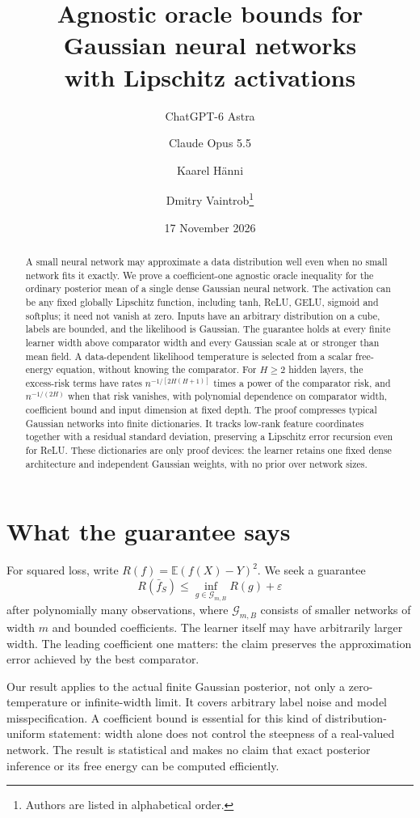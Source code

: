 \documentclass[11pt]{article}
\title{Agnostic oracle bounds for Gaussian neural networks\\with Lipschitz activations}
\author{ChatGPT-6 Astra \and Claude Opus 5.5 \and Kaarel H\"anni \and
Dmitry Vaintrob\thanks{Authors are listed in alphabetical order.}}
\date{17 November 2026}
\theoremstyle{remark}\newtheorem{remark}[theorem]{Remark}
\newcommand{\E}{\mathbb E}\newcommand{\R}{\mathbb R}\newcommand{\Pp}{\mathbb P}
\newcommand{\calG}{\mathcal G}
\begin{document}
\maketitle
\begin{abstract}
A small neural network may approximate a data distribution well even when no small network fits it exactly. We prove a coefficient-one agnostic oracle inequality for the ordinary posterior mean of a single dense Gaussian neural network. The activation can be any fixed globally Lipschitz function, including tanh, ReLU, GELU, sigmoid and softplus; it need not vanish at zero. Inputs have an arbitrary distribution on a cube, labels are bounded, and the likelihood is Gaussian. The guarantee holds at every finite learner width above comparator width and every Gaussian scale at or stronger than mean field. A data-dependent likelihood temperature is selected from a scalar free-energy equation, without knowing the comparator. For $H\ge2$ hidden layers, the excess-risk terms have rates $n^{-1/[2H(H+1)]}$ times a power of the comparator risk, and $n^{-1/(2H)}$ when that risk vanishes, with polynomial dependence on comparator width, coefficient bound and input dimension at fixed depth. The proof compresses typical Gaussian networks into finite dictionaries. It tracks low-rank feature coordinates together with a residual standard deviation, preserving a Lipschitz error recursion even for ReLU. These dictionaries are only proof devices: the learner retains one fixed dense architecture and independent Gaussian weights, with no prior over network sizes.
\end{abstract}

\section{What the guarantee says}
For squared loss, write $R(f)=\E(f(X)-Y)^2$. We seek a guarantee
\[
 R(\bar f_S)\le\inf_{g\in\calG_{m,B}}R(g)+\varepsilon
\]
after polynomially many observations, where $\calG_{m,B}$ consists of smaller networks of width $m$ and bounded coefficients. The learner itself may have arbitrarily larger width. The leading coefficient one matters: the claim preserves the approximation error achieved by the best comparator.

Our result applies to the actual finite Gaussian posterior, not only a zero-temperature or infinite-width limit. It covers arbitrary label noise and model misspecification. A coefficient bound is essential for this kind of distribution-uniform statement: width alone does not control the steepness of a real-valued network. The result is statistical and makes no claim that exact posterior inference or its free energy can be computed efficiently.
\end{document}
